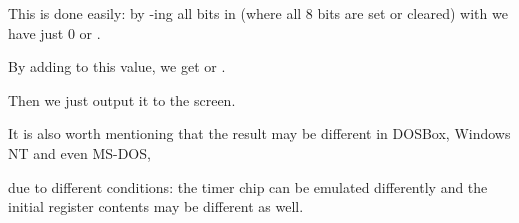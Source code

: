 This is done easily: by -ing all bits in  (where all 8 bits are set or cleared) with  we have just 0 or .%


By adding  to this value, we get  or .%

Then we just output it to the screen.

\subsectionold{\Conclusion{}}

It is also worth mentioning that the result may 
be different in DOSBox, \gls{Windows NT} and even MS-DOS, 

due to different
conditions: the timer chip can be emulated differently and the initial register contents may be different as well.
